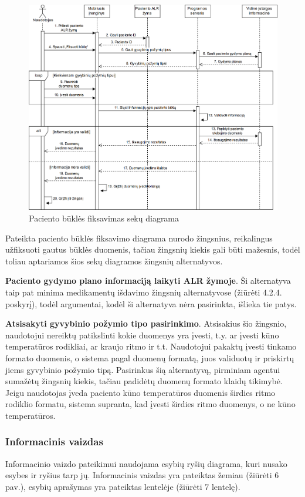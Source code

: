 \begin{figure}[H]
    \centering
    \includegraphics[scale=0.27]{images/buklesFiksavimas}
    \caption{Paciento būklės fiksavimas sekų diagrama} 
\end{figure}

Pateikta paciento būklės fiksavimo diagrama nurodo žingsnius, reikalingus užfiksuoti gautus būklės duomenis, tačiau žingsnių kiekis gali būti mažesnis, todėl toliau aptariamos šios sekų diagramos žingsnių alternatyvos.

\textbf{Paciento gydymo plano informaciją laikyti ALR žymoje}. Ši alternatyva taip pat minima medikamentų išdavimo žingsnių alternatyvose (žiūrėti 4.2.4. poskyrį), todėl argumentai, kodėl ši alternatyva nėra pasirinkta, išlieka tie patys.

\textbf{Atsisakyti gyvybinio požymio tipo pasirinkimo}. Atsisakius šio žingsnio, naudotojui nereiktų patikslinti kokie duomenys yra įvesti, t.y. ar įvesti kūno temperatūros rodikliai, ar kraujo ritmo ir t.t. Naudotojui pakaktų įvesti tinkamo formato duomenis, o sistema pagal duomenų formatą, juos validuotų ir priskirtų jiems gyvybinio požymio tipą. Pasirinkus šią alternatyvą, pirminiam agentui sumažėtų žingsnių kiekis, tačiau padidėtų duomenų formato klaidų tikimybė. Jeigu naudotojas įveda paciento kūno temperatūros duomenis širdies ritmo rodiklio formatu, sistema supranta, kad įvesti širdies ritmo duomenys, o ne kūno temperatūros.

\subsubsection{Informacinis vaizdas}
Informacinio vaizdo pateikimui naudojama esybių ryšių diagrama, kuri nusako esybes ir ryšius tarp jų. Informacinis vaizdas yra pateiktas žemiau (žiūrėti 6 pav.), esybių aprašymas yra pateiktas lentelėje (žiūrėti 7 lentelę).

